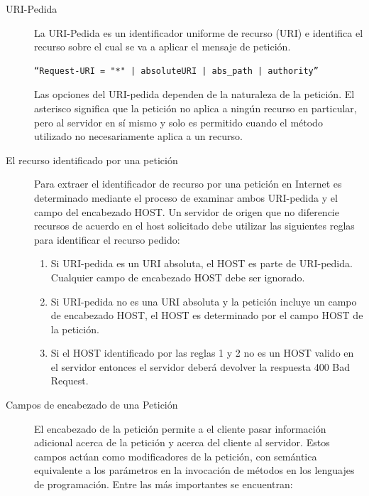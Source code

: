 \begin{description}
\item[URI-Pedida]
La URI-Pedida es un identificador uniforme de recurso (URI) e identifica el recurso sobre el cual se va a aplicar el mensaje de petición.
\begin{verbatim}
“Request-URI = "*" | absoluteURI | abs_path | authority”
\end{verbatim}

Las opciones del URI-pedida dependen de la naturaleza de la petición. El asterisco significa que la petición no aplica a ningún recurso en particular, pero al servidor en sí mismo y solo es permitido cuando el método utilizado no necesariamente aplica a un recurso.

\item[El recurso identificado por una petición]

Para extraer el identificador de recurso por una petición en Internet es determinado mediante el proceso de examinar ambos URI-pedida y el campo del encabezado HOST.
Un servidor de origen que no diferencie recursos de acuerdo en el host solicitado debe utilizar las siguientes reglas para identificar el recurso pedido:
\begin{enumerate}
\item Si URI-pedida es un URI absoluta, el HOST es parte de URI-pedida. Cualquier campo de encabezado HOST debe ser ignorado.
\item Si URI-pedida no es una URI absoluta y la petición incluye un campo de encabezado HOST, el HOST es determinado por el campo HOST de la petición. 
\item Si el HOST identificado por las reglas 1 y 2 no es un HOST valido en el servidor entonces el servidor deberá devolver la respuesta 400 Bad Request.
\end{enumerate}

\item[Campos de encabezado de una Petición]

El encabezado de la petición permite a el cliente pasar información adicional acerca de la petición y acerca del cliente al servidor. Estos campos actúan como modificadores de la petición, con semántica equivalente a los parámetros en la invocación de métodos en los lenguajes de programación. Entre las más importantes se encuentran:


\end{description}
